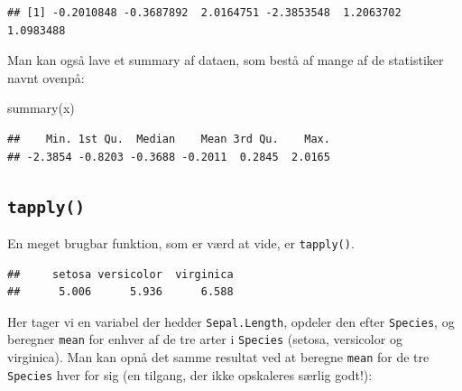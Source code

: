 \documentclass[
]{book}
\newenvironment{Shaded}{\begin{snugshade}}{\end{snugshade}}
\newcommand{\CommentTok}[1]{\textcolor[rgb]{0.56,0.35,0.01}{\textit{#1}}}
\newcommand{\FunctionTok}[1]{\textcolor[rgb]{0.00,0.00,0.00}{#1}}
\newcommand{\NormalTok}[1]{#1}
\newcommand{\SpecialCharTok}[1]{\textcolor[rgb]{0.00,0.00,0.00}{#1}}
\begin{document}
\begin{verbatim}
## [1] -0.2010848 -0.3687892  2.0164751 -2.3853548  1.2063702  1.0983488
\end{verbatim}

Man kan også lave et summary af dataen, som bestå af mange af de statistiker navnt ovenpå:

\begin{Shaded}
\begin{Highlighting}[]
\FunctionTok{summary}\NormalTok{(x)}
\end{Highlighting}
\end{Shaded}

\begin{verbatim}
##    Min. 1st Qu.  Median    Mean 3rd Qu.    Max. 
## -2.3854 -0.8203 -0.3688 -0.2011  0.2845  2.0165
\end{verbatim}

\hypertarget{tapply}{%
\subsection{\texorpdfstring{\texttt{tapply()}}{tapply()}}\label{tapply}}

En meget brugbar funktion, som er værd at vide, er \texttt{tapply()}.

\begin{Shaded}
\end{Shaded}

\begin{verbatim}
##     setosa versicolor  virginica 
##      5.006      5.936      6.588
\end{verbatim}

Her tager vi en variabel der hedder \texttt{Sepal.Length}, opdeler den efter \texttt{Species}, og beregner \texttt{mean} for enhver af de tre arter i \texttt{Species} (setosa, versicolor og virginica). Man kan opnå det samme resultat ved at beregne \texttt{mean} for de tre \texttt{Species} hver for sig (en tilgang, der ikke opskaleres særlig godt!):
\end{document}
